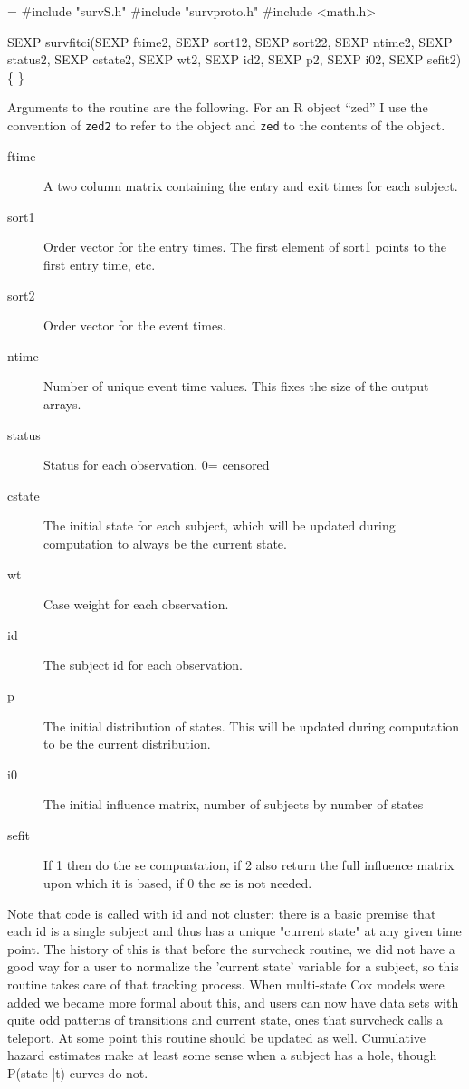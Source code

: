 \documentclass{article}
\begin{document}
\begin{nwchunk}
=
 #include "survS.h"
 #include "survproto.h"
 #include <math.h>
 
 SEXP survfitci(SEXP ftime2,  SEXP sort12,  SEXP sort22, SEXP ntime2,
                     SEXP status2, SEXP cstate2, SEXP wt2,  SEXP id2,
                     SEXP p2,      SEXP i02,     SEXP sefit2) \{   
 \}
\end{nwchunk}
Arguments to the routine are the following.
For an R object ``zed'' I use the convention of \Verb!zed2! to refer to the
object and \Verb!zed! to the contents of the object.
\begin{description}
  \item[ftime] A two column matrix containing the entry and exit times
    for each subject.
  \item[sort1] Order vector for the entry times.  The first element of sort1
    points to the first entry time, etc.
  \item[sort2] Order vector for the event times.
  \item[ntime] Number of unique event time values.  This fixes the size of
    the output arrays.
  \item[status] Status for each observation.  0= censored
  \item[cstate] The initial state for each subject, which will be
    updated during computation to always be the current state.
  \item[wt] Case weight for each observation.
  \item[id] The subject id for each observation.
  \item[p] The initial distribution of states.  This will be updated during
    computation to be the current distribution.
  \item[i0] The initial influence matrix, number of subjects by number of states
  \item[sefit] If 1 then do the se compuatation, if 2 also return the full
    influence matrix upon which it is based, if 0 the se is not needed.
\end{description}

Note that code is called with id and not cluster: there is a basic premise that
each id is a single subject and thus has a unique "current state" at any
given time point.  The history of this is that before the survcheck routine,
we did not have a good way for a user to normalize the 'current state' variable
for a subject, so this routine takes care of that tracking process. 
When multi-state Cox models were added we became more formal about this, and
users can now have data sets with quite odd patterns of transitions and current
state, ones that survcheck calls a teleport.  At some point this routine should
be updated as well.  Cumulative hazard estimates make at least some sense
when a subject has a hole, though P(state |t) curves do not.
\end{document}
